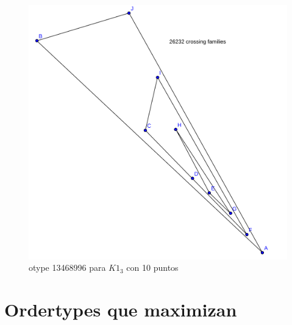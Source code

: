 \documentclass[11pt,epsf,times,letterpaper]{article}
\begin{document}
	\begin{figure}[!h]
		\includegraphics[scale=.25]{k13/min10_otype13468996.png}
		\caption{otype 13468996 para $K1_3$ con 10 puntos}
	\end{figure}

	\newpage
	\newpage

	\section{Ordertypes que maximizan}
	
\end{document}
